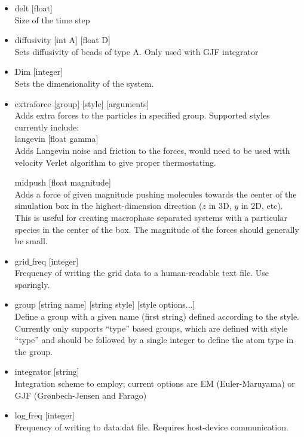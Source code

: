 \documentclass[12pt]{article}
\begin{document}
\begin{itemize}
    
    \item
    delt [float]
    \\[8pt]
    Size of the time step
    
    
    \item
    diffusivity [int A] [float D]
    \\[8pt]
    Sets diffusivity of beads of type A. Only used with GJF integrator
    
  \item
    Dim [integer] 
    \\[8pt]
    Sets the dimensionality of the system.


	\item
	extraforce [group] [style] [arguments]
	\\[8pt]
	Adds extra forces to the particles in specified group. Supported styles currently include:
	\\[8pt]
	langevin [float gamma]
	\\
	Adds Langevin noise and friction to the forces, would need to be used with velocity Verlet algorithm to give proper thermostating.
	
	midpush [float magnitude]
	\\
	Adds a force of given magnitude pushing molecules towards the center of the simulation box in the highest-dimension direction ($z$ in 3D, $y$ in 2D, etc). This is useful for creating macrophase separated systems with a particular species in the center of the box. The magnitude of the forces should generally be small.
    
    \item
    grid$\_$freq [integer]
    \\[8pt]
    Frequency of writing the grid data to a human-readable text file. Use sparingly.
    
	\item
	group [string name] [string style] [style options...]
	\\[8pt]
	Define a group with a given name (first string) defined according to the style. Currently only supports ``type'' based groups, which are defined with style ``type'' and should be followed by a single integer to define the atom type in the group.

  
  	\item
    integrator [string]
    \\[8pt]
    Integration scheme to employ; current options are EM (Euler-Maruyama) or GJF (Gr{\o}nbech-Jensen and Farago)


	\item
	log$\_$freq [integer]
	\\[8pt]
	Frequency of writing to data.dat file. Requires host-device communication.
	

\end{itemize}
\end{document}
